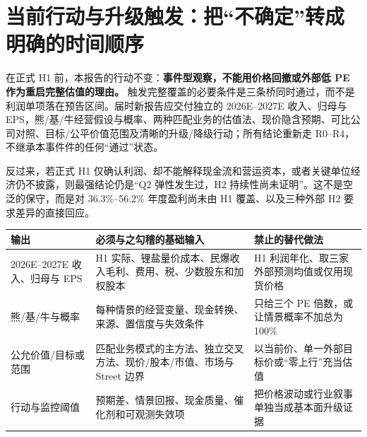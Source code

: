 \section{当前行动与升级触发：把“不确定”转成明确的时间顺序}

在正式 H1 前，本报告的行动不变：\textbf{事件型观察，不能用价格回撤或外部低 PE 作为重启完整估值的理由。} 触发完整覆盖的必要条件是三条桥同时通过，而不是利润单项落在预告区间。届时新报告应交付独立的 2026E--2027E 收入、归母与 EPS，熊/基/牛经营假设与概率、两种匹配业务的估值法、现价隐含预期、可比公司对照、目标/公平价值范围及清晰的升级/降级行动；所有结论重新走 R0--R4，不继承本事件件的任何“通过”状态。

反过来，若正式 H1 仅确认利润、却不能解释现金流和营运资本，或者关键单位经济仍不披露，则最强结论仍是“Q2 弹性发生过，H2 持续性尚未证明”。这不是空泛的保守，而是对 36.3\%--56.2\% 年度盈利尚未由 H1 覆盖、以及三种外部 H2 要求差异的直接回应。

\begin{exhibitbox}
\begin{tabularx}{\exhibitboxwidth}{L{2.7cm}X X}
\toprule
输出 & 必须与之勾稽的基础输入 & 禁止的替代做法 \\
\midrule
2026E--2027E 收入、归母与 EPS & H1 实际、锂盐量价成本、民爆收入毛利、费用、税、少数股东和加权股本 & H1 利润年化、取三家外部预测均值或仅用现货价格 \\
熊/基/牛与概率 & 每种情景的经营变量、现金转换、来源、置信度与失效条件 & 只给三个 PE 倍数，或让情景概率不加总为 100\% \\
公允价值/目标或范围 & 匹配业务模式的主方法、独立交叉方法、现价/股本/市值、市场与 Street 边界 & 以当前价、单一外部目标价或“零上行”充当估值 \\
行动与监控阈值 & 预期差、情景回报、现金质量、催化剂和可观测失效项 & 把价格波动或行业叙事单独当成基本面升级证据 \\
\bottomrule
\end{tabularx}
\end{exhibitbox}
